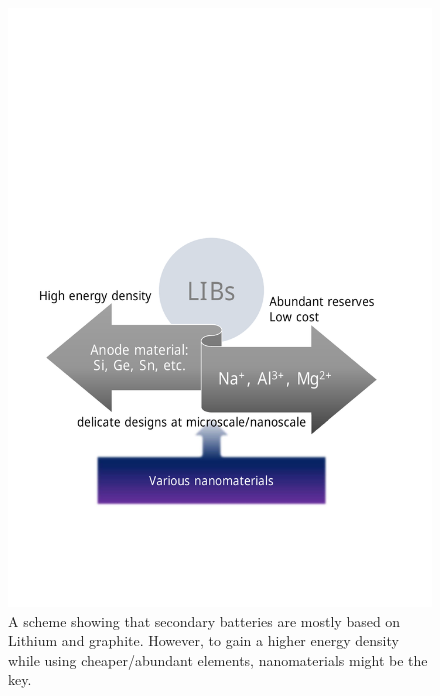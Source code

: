 \begin{figure}  
\centering
\includegraphics[width=340pt]{figures/figure1_lib.pdf}
\caption[Future of secondary ion batteries]{{A scheme showing that secondary batteries are mostly based on Lithium and graphite. However, to gain a higher energy density while using cheaper/abundant elements, nanomaterials might be the key. }
\label{fig:1lib}}
\end{figure}

